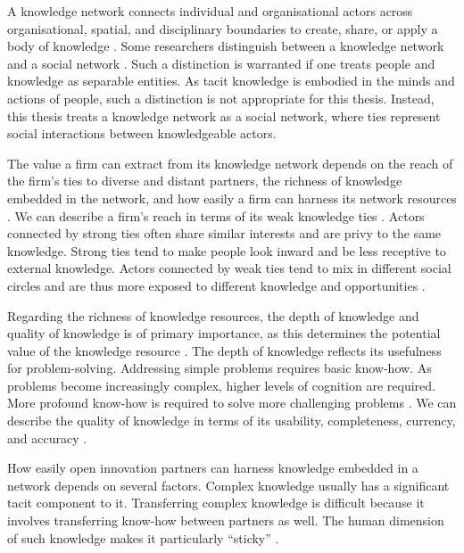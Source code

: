 A knowledge network connects individual and organisational actors across organisational, spatial, and disciplinary boundaries to create, share, or apply a body of knowledge \citep{pugh2013designing}. Some researchers distinguish between a knowledge network and a social network \citep[e.g.][]{yayavaram2008decomposability,wang2014knowledge,brennecke2017firm}. Such a distinction is warranted if one treats people and knowledge as separable entities. As tacit knowledge is embodied in the minds and actions of people, such a distinction is not appropriate for this thesis. Instead, this thesis treats a knowledge network as a social network, where ties represent social interactions between knowledgeable actors. \medskip

The value a firm can extract from its knowledge network depends on the reach of the firm's ties to diverse and distant partners, the richness of knowledge embedded in the network, and how easily a firm can harness its network resources \citep{gulati2011networks}. We can describe a firm's reach in terms of its weak knowledge ties \citep{hansen1999search}. Actors connected by strong ties often share similar interests and are privy to the same knowledge. Strong ties tend to make people look inward and be less receptive to external knowledge. Actors connected by weak ties tend to mix in different social circles and are thus more exposed to different knowledge and opportunities \citep{granovetter1973strength}. \medskip

Regarding the richness of knowledge resources, the depth of knowledge and quality of knowledge is of primary importance, as this determines the potential value of the knowledge resource \citep{davenport1998working,kane2005knowledge}. The depth of knowledge reflects its usefulness for problem-solving. Addressing simple problems requires basic know-how. As problems become increasingly complex, higher levels of cognition are required. More profound know-how is required to solve more challenging problems \citep{webb2002depth,bennet2008depth}. We can describe the quality of knowledge in terms of its usability, completeness, currency, and accuracy \citep{wixom2005theoretical}. \medskip

How easily open innovation partners can harness knowledge embedded in a network depends on several factors. Complex knowledge usually has a significant tacit component to it. Transferring complex knowledge is difficult because it involves transferring know-how between partners as well. The human dimension of such knowledge makes it particularly \enquote{sticky} \citep{von1994sticky,szulanski2003sticky}. \medskip

